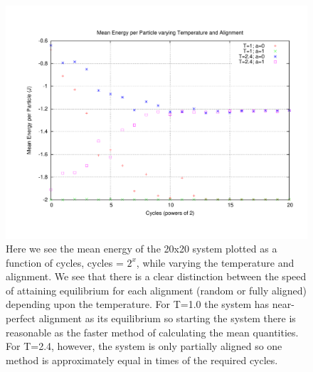 \documentclass[11pt,a4paper]{article}
\begin{document}
\begin{figure}
\centering
\includegraphics[width=1.0\textwidth]{n20_meanenergy.pdf}
\caption{Here we see the mean energy of the 20x20 system plotted as a function of cycles, cycles = $2^x$, while varying the temperature and alignment. We see that there is a clear distinction between the speed of attaining equilibrium for each alignment (random or fully aligned) depending upon the temperature. For T=1.0 the system has near-perfect alignment as its equilibrium so starting the system there is reasonable as the faster method of calculating the mean quantities. For T=2.4, however, the system is only partially aligned so one method is approximately equal in times of the required cycles.}
\end{figure}
\end{document}
